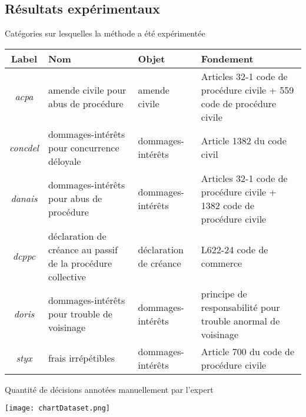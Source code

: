 \subsection{Résultats expérimentaux}
\begin{frame}[t]{\mysubsectiontitle}
	Catégories sur lesquelles la méthode a été expérimentée
	
	\scriptsize
		\begin{tabular}{|c|p{}|p{}|p{}|}
			\hline
			\textbf{Label} & \textbf{Nom} & \textbf{Objet} & \textbf{Fondement} \\ \hline
			\textit{acpa} & amende civile pour abus de procédure & amende civile & Articles 32-1 code de procédure civile + 559 code de procédure civile \\ \hline
			\textit{concdel} & dommages-intérêts pour concurrence déloyale & dommages-intérêts & Article 1382 du code civil \\ \hline
			\textit{danais} & dommages-intérêts pour abus de procédure & dommages-intérêts & Articles 32-1 code de procédure civile + 1382 code de procédure civile \\ \hline
			\textit{dcppc} & déclaration de créance au passif de la procédure collective & déclaration de créance & L622-24 code de commerce \\ \hline
			\textit{doris} & dommages-intérêts pour trouble de voisinage & dommages-intérêts & principe de responsabilité pour trouble anormal de voisinage \\ \hline
			\textit{styx} & frais irrépétibles & dommages-intérêts & Article 700 du code de procédure civile \\ \hline
		\end{tabular}
\end{frame}
\begin{frame}[t]{\mysubsectiontitle}
	Quantité de décisions annotées manuellement par l'expert
	
	\centering	\texttt{[image: chartDataset.png]}
\end{frame}


